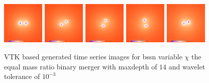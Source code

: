 \begin{figure}[H]
	\centering
	\includegraphics[width=0.18\textwidth]{figs/vtk/r1/img_slice_000000.png}
	\includegraphics[width=0.18\textwidth]{figs/vtk/r1/img_slice_000020.png}
	\includegraphics[width=0.18\textwidth]{figs/vtk/r1/img_slice_000040.png}
	\includegraphics[width=0.18\textwidth]{figs/vtk/r1/img_slice_000060.png}
	\includegraphics[width=0.18\textwidth]{figs/vtk/r1/img_slice_000100.png}
	\caption{VTK based generated time series images for bssn variable $\chi$ the equal mass ratio binary merger with maxdepth of $14$ and wavelet tolerance of $10^{-3}$ \label{fig:vtk:r1}}
\end{figure}


